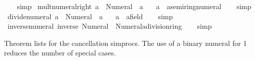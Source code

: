 \begin{isabellebody}
%
\isadelimproof
\ \ %
\endisadelimproof
%
\isatagproof
{}\isamarkupfalse%
\ simp%
\endisatagproof
{\isafoldproof}%
%
\isadelimproof
\isanewline
%
\endisadelimproof
\isanewline
{}\isamarkupfalse%
\ mult{\isacharunderscore}{\kern0pt}numeral{\isacharunderscore}{\kern0pt}{}{\isacharunderscore}{\kern0pt}right{\isacharcolon}{\kern0pt}\ {\isachardoublequoteopen}a\ {\isacharasterisk}{\kern0pt}\ Numeral{}\ {\isacharequal}{\kern0pt}\ a{\isachardoublequoteclose}\isanewline
\ \ \ a\ {\isacharcolon}{\kern0pt}{\isacharcolon}{\kern0pt}\ {\isachardoublequoteopen}{\isacharprime}{\kern0pt}a{\isacharcolon}{\kern0pt}{\isacharcolon}{\kern0pt}semiring{\isacharunderscore}{\kern0pt}numeral{\isachardoublequoteclose}\isanewline
%
\isadelimproof
\ \ %
\endisadelimproof
%
\isatagproof
{}\isamarkupfalse%
\ simp%
\endisatagproof
{\isafoldproof}%
%
\isadelimproof
\isanewline
%
\endisadelimproof
\isanewline
{}\isamarkupfalse%
\ divide{\isacharunderscore}{\kern0pt}numeral{\isacharunderscore}{\kern0pt}{}{\isacharcolon}{\kern0pt}\ {\isachardoublequoteopen}a\ {\isacharslash}{\kern0pt}\ Numeral{}\ {\isacharequal}{\kern0pt}\ a{\isachardoublequoteclose}\isanewline
\ \ \ a\ {\isacharcolon}{\kern0pt}{\isacharcolon}{\kern0pt}\ {\isachardoublequoteopen}{\isacharprime}{\kern0pt}a{\isacharcolon}{\kern0pt}{\isacharcolon}{\kern0pt}field{\isachardoublequoteclose}\isanewline
%
\isadelimproof
\ \ %
\endisadelimproof
%
\isatagproof
{}\isamarkupfalse%
\ simp%
\endisatagproof
{\isafoldproof}%
%
\isadelimproof
\isanewline
%
\endisadelimproof
\isanewline
{}\isamarkupfalse%
\ inverse{\isacharunderscore}{\kern0pt}numeral{\isacharunderscore}{\kern0pt}{}{\isacharcolon}{\kern0pt}\ {\isachardoublequoteopen}inverse\ Numeral{}\ {\isacharequal}{\kern0pt}\ {\isacharparenleft}{\kern0pt}Numeral{}{\isacharcolon}{\kern0pt}{\isacharcolon}{\kern0pt}{\isacharprime}{\kern0pt}a{\isacharcolon}{\kern0pt}{\isacharcolon}{\kern0pt}division{\isacharunderscore}{\kern0pt}ring{\isacharparenright}{\kern0pt}{\isachardoublequoteclose}\isanewline
%
\isadelimproof
\ \ %
\endisadelimproof
%
\isatagproof
{}\isamarkupfalse%
\ simp%
\endisatagproof
{\isafoldproof}%
%
\isadelimproof
%
\endisadelimproof
%
\begin{isamarkuptext}%
Theorem lists for the cancellation simprocs. The use of a binary
  numeral for 1 reduces the number of special cases.%
\end{isamarkuptext}\isamarkuptrue%

\end{isabellebody}
